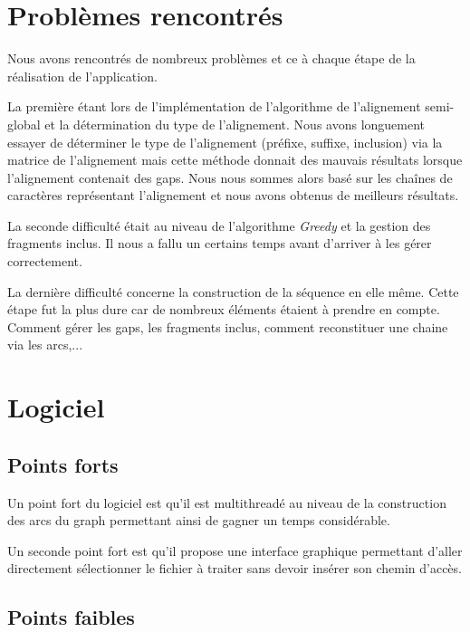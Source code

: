 \documentclass[12pt,a4paper,final]{article}
\begin{document}
\newpage
\section{Problèmes rencontrés}

Nous avons rencontrés de nombreux problèmes et ce à chaque étape de la réalisation de l'application.\medskip

La première étant lors de l'implémentation de l'algorithme de l'alignement semi-global et la détermination du type de l'alignement.  Nous avons longuement essayer de déterminer le type de l'alignement (préfixe, suffixe, inclusion) via la matrice de l'alignement mais cette méthode donnait des mauvais résultats lorsque l'alignement contenait des gaps.  Nous nous sommes alors basé sur les chaînes de caractères représentant l'alignement et nous avons obtenus de meilleurs résultats.\medskip

La seconde difficulté était au niveau de l'algorithme \textit{Greedy} et la gestion des fragments inclus.  Il nous a fallu un certains temps avant d'arriver à les gérer correctement.\medskip

La dernière difficulté concerne la construction de la séquence en elle même.  Cette étape fut la plus dure car de nombreux éléments étaient à prendre en compte.  Comment gérer les gaps, les fragments inclus, comment reconstituer une chaine via les arcs,...

\newpage
\section{Logiciel}

\subsection{Points forts}

Un point fort du logiciel est qu'il est multithreadé au niveau de la construction des arcs du graph permettant ainsi de gagner un temps considérable.

Un seconde point fort est qu'il propose une interface graphique permettant d'aller directement sélectionner le fichier à traiter sans devoir insérer son chemin d'accès.

\subsection{Points faibles}
\end{document}
